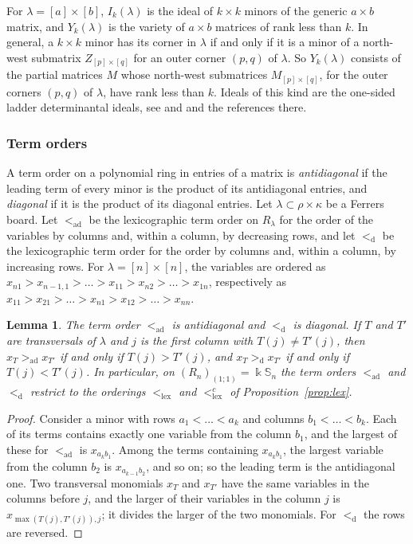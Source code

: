 \documentclass[11pt]{amsart}
\newtheorem{lemma}[theorem]{Lemma}
\theoremstyle{definition}
\theoremstyle{remark}
\newcommand{\bS}{\mathbb{S}}
\newcommand{\kk}{\Bbbk}
\newcommand{\lex}{\mathrm{lex}}
\newcommand{\ad}{\mathrm{ad}}
\newcommand{\dg}{\mathrm{d}}
\begin{document}
For $\lambda=[a]\times[b]$, $I_k(\lambda)$ is the ideal of $k\times k$ minors of the generic $a\times b$ matrix, and $Y_k(\lambda)$ is the variety of $a\times b$ matrices of rank less than $k$. In general, a $k\times k$ minor has its corner in $\lambda$ if and only if it is a minor of a north-west submatrix $Z_{[p]\times[q]}$ for an outer corner $(p,q)$ of $\lambda$. So $Y_k(\lambda)$ consists of the partial matrices $M$ whose north-west submatrices $M_{[p]\times[q]}$, for the outer corners $(p,q)$ of $\lambda$, have rank less than $k$. Ideals of this kind are the one-sided ladder determinantal ideals, see \cite[Section~2.4]{KM} and \cite{KMY} and the references there.

\subsubsection{Term orders}
A term order on a polynomial ring in entries of a matrix is \emph{antidiagonal} if the leading term of every minor is the product of its antidiagonal entries, and \emph{diagonal} if it is the product of its diagonal entries. Let $\lambda\subset\rho\times\kappa$ be a Ferrers board. Let $<_\ad$ be the lexicographic term order on $R_\lambda$ for the order of the variables by columns and, within a column, by decreasing rows, and let $<_\dg$ be the lexicographic term order for the order by columns and, within a column, by increasing rows. For $\lambda=[n]\times[n]$, the variables are ordered as $x_{n1}>x_{n-1,1}>\dots>x_{11}>x_{n2}>\dots>x_{1n}$, respectively as $x_{11}>x_{21}>\dots>x_{n1}>x_{12}>\dots>x_{nn}$.

\begin{lemma}\label{lem:orders}
The term order $<_\ad$ is antidiagonal and $<_\dg$ is diagonal. If $T$ and $T'$ are transversals of $\lambda$ and $j$ is the first column with $T(j)\ne T'(j)$, then $x_T>_\ad x_{T'}$ if and only if $T(j)>T'(j)$, and $x_T>_\dg x_{T'}$ if and only if $T(j)<T'(j)$. In particular, on $(R_n)_{(1;1)}=\kk\bS_n$ the term orders $<_\ad$ and $<_\dg$ restrict to the orderings $<_\lex$ and $<_\lex^c$ of Proposition~\ref{prop:lex}.
\end{lemma}

\begin{proof}
Consider a minor with rows $a_1<\dots<a_k$ and columns $b_1<\dots<b_k$. Each of its terms contains exactly one variable from the column $b_1$, and the largest of these for $<_\ad$ is $x_{a_kb_1}$. Among the terms containing $x_{a_kb_1}$, the largest variable from the column $b_2$ is $x_{a_{k-1}b_2}$, and so on; so the leading term is the antidiagonal one. Two transversal monomials $x_T$ and $x_{T'}$ have the same variables in the columns before $j$, and the larger of their variables in the column $j$ is $x_{\max(T(j),T'(j)),j}$; it divides the larger of the two monomials. For $<_\dg$ the rows are reversed.
\end{proof}
\end{document}
